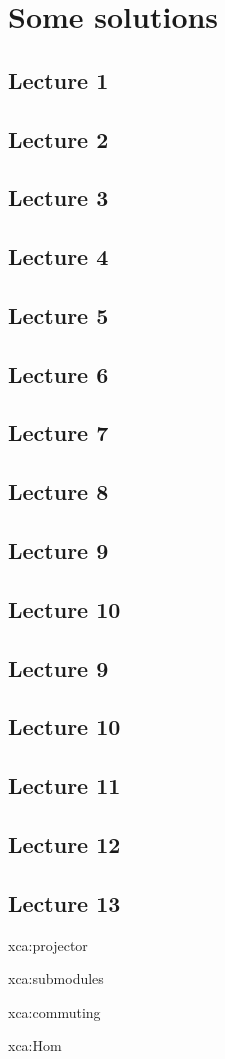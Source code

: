 \chapter{Some solutions}

\section*{Lecture 1}
\section*{Lecture 2}
\section*{Lecture 3}
\section*{Lecture 4}
\section*{Lecture 5}
\section*{Lecture 6}
\section*{Lecture 7}
\section*{Lecture 8}
\section*{Lecture 9}
\section*{Lecture 10}
\section*{Lecture 9}
\section*{Lecture 10}
\section*{Lecture 11}
\section*{Lecture 12}
\section*{Lecture 13}

\begin{sol}{xca:projector}
\end{sol}

\begin{sol}{xca:submodules}
\end{sol}

\begin{sol}{xca:commuting}
\end{sol}

\begin{sol}{xca:Hom}
\end{sol}